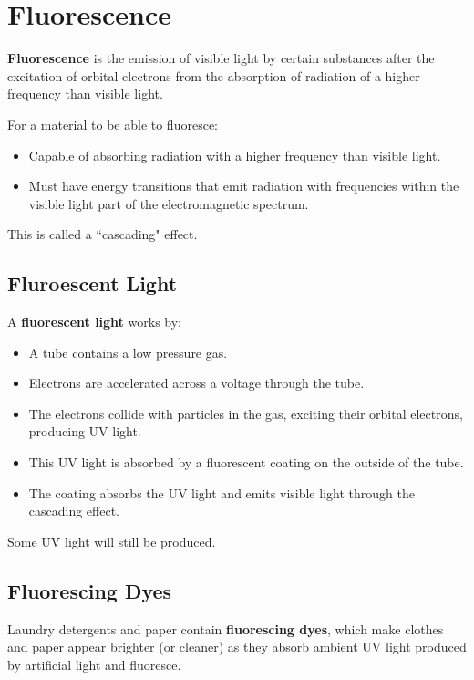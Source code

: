 \documentclass[a4paper,11pt]{report}
\begin{document}
\section{Fluorescence}


\textbf{Fluorescence} is the emission of visible light by certain substances
after the excitation of orbital electrons from the absorption of radiation of
a higher frequency than visible light.

For a material to be able to fluoresce:

\begin{itemize}
\item Capable of absorbing radiation with a higher frequency than visible light.
\item Must have energy transitions that emit radiation with frequencies within
	the visible light part of the electromagnetic spectrum.
\end{itemize}

This is called a ``cascading" effect.

\subsection{Fluroescent Light}


A \textbf{fluorescent light} works by:

\begin{itemize}
\item A tube contains a low pressure gas.
\item Electrons are accelerated across a voltage through the tube.
\item The electrons collide with particles in the gas, exciting their orbital
	electrons, producing UV light.
\item This UV light is absorbed by a fluorescent coating on the outside of the
	tube.
\item The coating absorbs the UV light and emits visible light through the
	cascading effect.
\end{itemize}

Some UV light will still be produced.

\subsection{Fluorescing Dyes}

Laundry detergents and paper contain \textbf{fluorescing dyes}, which make
clothes and paper appear brighter (or cleaner) as they absorb ambient UV light
produced by artificial light and fluoresce.
\end{document}
